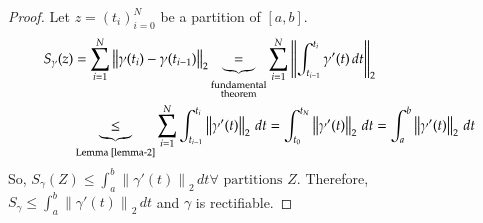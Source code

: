 \documentclass{article}
\newcommand{\norm}[1]{\left\|#1\right\|}
\begin{document}
\begin{proof}
  Let $z = (t_i)_{i=0}^N$ be a partition of $[a,b]$.
  \begin{align*}
    S_\gamma(z)
      &= \sum_{i=1}^N \norm{\gamma(t_i) - \gamma(t_{i-1})}_2
      \underbrace{=}_{\substack{\text{fundamental} \\ \text{theorem}}} \sum_{i=1}^N \norm{\int_{t_{i-1}}^{t_i} \gamma'(t) \, dt}_2 \\
      &\underbrace{\leq}_{\text{Lemma~\ref{lemma-2}}} \sum_{i=1}^N \int_{t_{i-1}}^{t_i} \norm{\gamma'(t)}_2 \, dt
      = \int_{t_0}^{t_N} \norm{\gamma'(t)}_2 \, dt
      = \int_a^b \norm{\gamma'(t)}_2 \, dt
  \end{align*}
  So, $S_{\gamma}(Z) \leq \int_a^b \norm{\gamma'(t)}_2 \, dt \forall \text{ partitions } Z$.
  Therefore, $S_{\gamma} \leq \int_a^b \norm{\gamma'(t)}_2 \, dt$ and $\gamma$ is rectifiable.


\end{proof}
\end{document}
